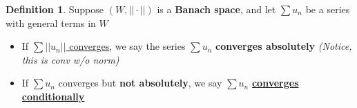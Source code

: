 \documentclass[12pt,a4paper]{article}
\theoremstyle{definition}
\newtheorem{defin}{Definition}[subsection]
\newenvironment{definition}{
  \begin{defin}
}{
  \end{defin}
  \vspace{0.125em}
}
\begin{document}
\begin{definition}
  Suppose $(W, ||\cdot||)$ is a \textbf{Banach space}, and let $\sum u_n$ be a series with general terms in $W$
  \begin{itemize}
    \item If \underline{$\sum ||u_n||$ converges}, we say the series $\sum u_n$ \textbf{converges absolutely} \textit{(Notice, this is conv w/o norm)}
    \item If $\sum u_n$ converges but \textbf{not absolutely}, we say $\sum u_n$ \underline{\textbf{converges conditionally}}
  \end{itemize}
\end{definition}
\end{document}
